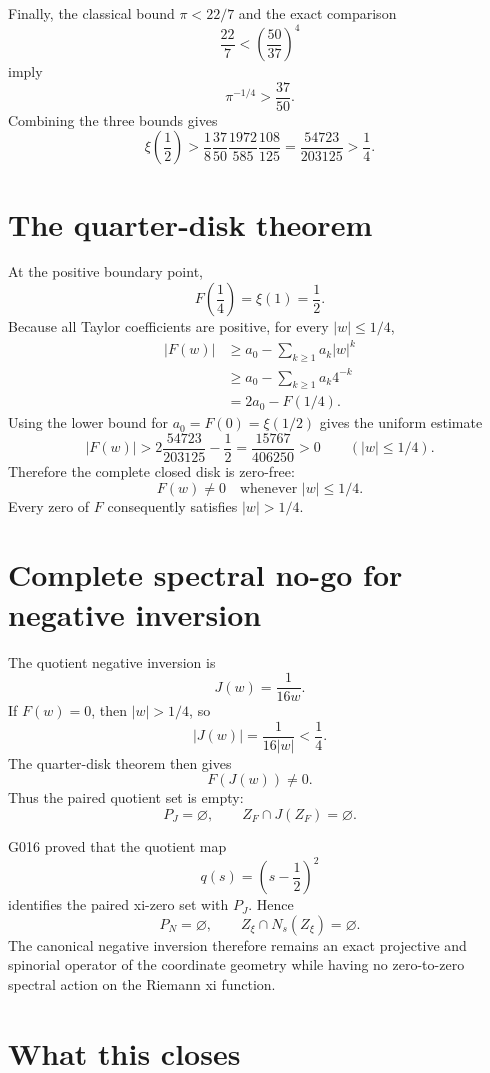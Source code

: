 Finally, the classical bound $\pi<22/7$ and the exact comparison
\[
 \frac{22}{7}<\left(\frac{50}{37}\right)^4
\]
imply
\[
 \pi^{-1/4}>\frac{37}{50}.
\]
Combining the three bounds gives
\[
 \boxed{
 \xi\!\left(\frac12\right)
 >\frac18\frac{37}{50}\frac{1972}{585}\frac{108}{125}
 =\frac{54723}{203125}
 >\frac14.}
\]

\section{The quarter-disk theorem}

At the positive boundary point,
\[
 F\!\left(\frac14\right)=\xi(1)=\frac12.
\]
Because all Taylor coefficients are positive, for every $|w|\le1/4$,
\[
 \begin{aligned}
 |F(w)|
 &\ge a_0-\sum_{k\ge1}a_k|w|^k\\
 &\ge a_0-\sum_{k\ge1}a_k4^{-k}\\
 &=2a_0-F(1/4).
 \end{aligned}
\]
Using the lower bound for $a_0=F(0)=\xi(1/2)$ gives the uniform estimate
\[
 \boxed{
 |F(w)|>
 2\frac{54723}{203125}-\frac12
 =\frac{15767}{406250}>0
 \qquad(|w|\le1/4).}
\]
Therefore the complete closed disk is zero-free:
\[
 \boxed{F(w)\ne0\quad\text{whenever }|w|\le1/4.}
\]
Every zero of $F$ consequently satisfies $|w|>1/4$.

\section{Complete spectral no-go for negative inversion}

The quotient negative inversion is
\[
 J(w)=\frac1{16w}.
\]
If $F(w)=0$, then $|w|>1/4$, so
\[
 |J(w)|=\frac1{16|w|}<\frac14.
\]
The quarter-disk theorem then gives
\[
 F(J(w))\ne0.
\]
Thus the paired quotient set is empty:
\[
 \boxed{P_J=\varnothing},
 \qquad
 \boxed{Z_F\cap J(Z_F)=\varnothing}.
\]

G016 proved that the quotient map
\[
 q(s)=\left(s-\frac12\right)^2
\]
identifies the paired xi-zero set with $P_J$. Hence
\[
 \boxed{P_N=\varnothing},
 \qquad
 \boxed{Z_\xi\cap N_s(Z_\xi)=\varnothing}.
\]
The canonical negative inversion therefore remains an exact projective and spinorial operator of the coordinate geometry while having no zero-to-zero spectral action on the Riemann xi function.

\section{What this closes}

